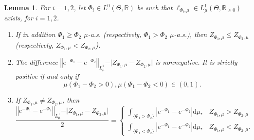 \documentclass[a4paper]{scrartcl}
\newtheorem{lemma}[theorem]{Lemma}
\theoremstyle{definition}
\numberwithin{equation}{section}
\newcommand{\R}{\mathbb{R}}
\newcommand{\rd}{\mathrm{d}}
\newcommand{\abs}[1]{\vert #1\vert}
\newcommand{\Abs}[1]{\left\vert#1\right\vert}
\newcommand{\Norm}[1]{\left\Vert #1 \right\Vert}
\begin{document}
\begin{lemma}
 \label{lemma_L1norm_difference_of_unnormalised_likelihoods_minus_abs_diff_normalisation_constants_misfit_perturbation}
For $i=1,2$, let $\Phi_i\in L^0(\Theta,\R)$ be such that $\ell_{\Phi_i,\mu}\in L^1_\mu(\Theta,\R_{\geq 0})$ exists, for $i=1,2$.
\begin{enumerate}
\item \label{item1_lemma_L1norm_difference_of_unnormalised_likelihoods_minus_abs_diff_normalisation_constants_misfit_perturbation} If in addition $\Phi_1\geq \Phi_2$ $\mu$-a.s. (respectively, $\Phi_1>\Phi_2$ $\mu$-a.s.), then $Z_{\Phi_1,\mu}\leq Z_{\Phi_2,\mu}$ (respectively, $Z_{\Phi_1,\mu}< Z_{\Phi_2,\mu}$). 

\item \label{item2_lemma_L1norm_difference_of_unnormalised_likelihoods_minus_abs_diff_normalisation_constants_misfit_perturbation} 
The difference $\Norm{e^{-\Phi_1}-e^{-\Phi_2}}_{L^1_\mu}- \abs{Z_{\Phi_1,\mu}-Z_{\Phi_2,\mu}}$ is nonnegative. It is strictly positive if and only if
\begin{equation}
\label{eq_hypothesis_difference_of_misfits_changes_sign_mu_almost_surely}
 \mu(\Phi_1-\Phi_2>0), \mu(\Phi_1-\Phi_2<0) \in (0,1).
\end{equation}

\item \label{item3_lemma_L1norm_difference_of_unnormalised_likelihoods_minus_abs_diff_normalisation_constants_misfit_perturbation}
If $Z_{\Phi_1,\mu}\neq Z_{\Phi_2,\mu}$, then 
\begin{equation*}
\frac{\Norm{e^{-\Phi_1}-e^{-\Phi_2}}_{L^1_\mu}- \abs{Z_{\Phi_1,\mu}-Z_{\Phi_2,\mu}}}{2}=
 \begin{cases}
 \int_{\{\Phi_1>\Phi_2\}} \Abs{e^{-\Phi_1}-e^{-\Phi_2}}\rd \mu, & Z_{\Phi_1,\mu}>Z_{\Phi_2,\mu}
  \\
\int_{\{\Phi_1<\Phi_2\}} \Abs{e^{-\Phi_1}-e^{-\Phi_2}}\rd \mu, & Z_{\Phi_1,\mu}<Z_{\Phi_2,\mu}.
 \end{cases}
\end{equation*}
\end{enumerate}
\end{lemma}
\end{document}
